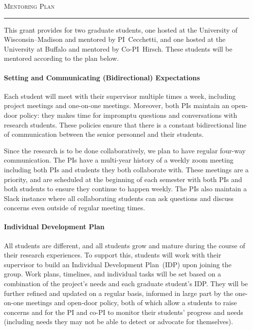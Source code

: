 

\usepackage{paralist}



\begin{center}
{\LARGE
\textsc{Mentoring Plan}
}
\end{center}
\hrule

\vspace{3mm}

This grant provides for two graduate students,
one hosted at the University of Wisconsin--Madison and mentored by PI~Cecchetti,
and one hosted at the University at Buffalo and mentored by Co-PI~Hirsch.
These students will be mentored according to the plan below.

\paragraph{Setting and Communicating (Bidirectional) Expectations}

Each student will meet with their supervisor multiple times a week, including project meetings and one-on-one meetings.
Moreover, both PIs maintain an open-door policy: they makes time for impromptu questions and conversations with research students.
These policies ensure that there is a constant bidirectional line of communication between the senior personnel and their students.

Since the research is to be done collaboratively, we plan to have regular four-way communication.
The PIs have a multi-year history of a weekly zoom meeting including both PIs and students they both collaborate with.
These meetings are a priority, and are scheduled at the beginning of each semester with both PIs and both students
to ensure they continue to happen weekly.
The PIs also maintain a Slack instance where all collaborating students can ask questions and discuss concerns even outside of regular meeting times.

\paragraph{Individual Development Plan}

All students are different, and all students grow and mature during the course of their research experiences.
To support this, students will work with their supervisor to build an Individual Development Plan~(IDP) upon joining the group.
Work plans, timelines, and individual tasks will be set based on a combination of the project's needs and each graduate student's IDP.
They will be further refined and updated on a regular basis, informed in large part by the one-on-one meetings and open-door policy,
both of which allow a students to raise concerns and for the PI and co-PI to monitor their students' progress and needs (including needs they may not be able to detect or advocate for themselves).

